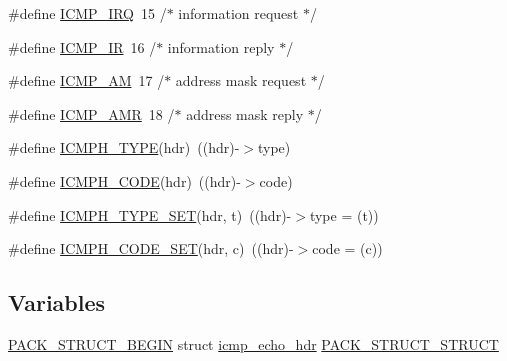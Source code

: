 \begin{DoxyCompactItemize}
\item 
\#define \hyperlink{openmote-cc2538_2lwip_2src_2include_2lwip_2prot_2icmp_8h_a55b78957e5ffd7aae0db3742b2c556a4}{I\+C\+M\+P\+\_\+\+I\+RQ}~15    /$\ast$ information request $\ast$/
\item 
\#define \hyperlink{openmote-cc2538_2lwip_2src_2include_2lwip_2prot_2icmp_8h_af9698624c0200d6be1681c9b5243d1e9}{I\+C\+M\+P\+\_\+\+IR}~16    /$\ast$ information reply $\ast$/
\item 
\#define \hyperlink{openmote-cc2538_2lwip_2src_2include_2lwip_2prot_2icmp_8h_aafd8ecaee2bd9157acd53aa36786939e}{I\+C\+M\+P\+\_\+\+AM}~17    /$\ast$ address mask request $\ast$/
\item 
\#define \hyperlink{openmote-cc2538_2lwip_2src_2include_2lwip_2prot_2icmp_8h_af77f81e08bcebe7c581da033c3f95465}{I\+C\+M\+P\+\_\+\+A\+MR}~18    /$\ast$ address mask reply $\ast$/
\item 
\#define \hyperlink{openmote-cc2538_2lwip_2src_2include_2lwip_2prot_2icmp_8h_a22fef4dade8b0b3b49651e2a2cb73c79}{I\+C\+M\+P\+H\+\_\+\+T\+Y\+PE}(hdr)~((hdr)-\/$>$type)
\item 
\#define \hyperlink{openmote-cc2538_2lwip_2src_2include_2lwip_2prot_2icmp_8h_a598231bf61f3b0e9f9a3117c385e0396}{I\+C\+M\+P\+H\+\_\+\+C\+O\+DE}(hdr)~((hdr)-\/$>$code)
\item 
\#define \hyperlink{openmote-cc2538_2lwip_2src_2include_2lwip_2prot_2icmp_8h_ace6032454f29355a352ec8218e45959f}{I\+C\+M\+P\+H\+\_\+\+T\+Y\+P\+E\+\_\+\+S\+ET}(hdr,  t)~((hdr)-\/$>$type = (t))
\item 
\#define \hyperlink{openmote-cc2538_2lwip_2src_2include_2lwip_2prot_2icmp_8h_a785da2cdfe7fea08e8c5a5a0197534c9}{I\+C\+M\+P\+H\+\_\+\+C\+O\+D\+E\+\_\+\+S\+ET}(hdr,  c)~((hdr)-\/$>$code = (c))
\end{DoxyCompactItemize}
\subsection*{Variables}
\begin{DoxyCompactItemize}
\item 
\hyperlink{group__compiler__abstraction_ga73199061891adf1b912d20835c7d5e96}{P\+A\+C\+K\+\_\+\+S\+T\+R\+U\+C\+T\+\_\+\+B\+E\+G\+IN} struct \hyperlink{structicmp__echo__hdr}{icmp\+\_\+echo\+\_\+hdr} \hyperlink{openmote-cc2538_2lwip_2src_2include_2lwip_2prot_2icmp_8h_a918236f9c0f177bc0014aa9fe504ad83}{P\+A\+C\+K\+\_\+\+S\+T\+R\+U\+C\+T\+\_\+\+S\+T\+R\+U\+CT}
\end{DoxyCompactItemize}


